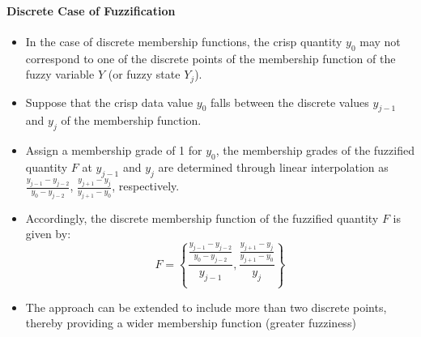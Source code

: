 \documentclass{tron}
\begin{document}
\paragraph{Discrete Case of Fuzzification}
\begin{itemize}
	\item In the case of discrete membership functions, the crisp quantity $y_0$ may not correspond to one of the discrete points of the membership function of the fuzzy variable $Y$ (or fuzzy state $Y_j$).
	\item Suppose that the crisp data value $y_0$ falls between the discrete values $y_{j-1}$ and $y_j$ of the membership function.
	\item Assign a membership grade of 1 for $y_0$, the membership grades of the fuzzified quantity $F$ at $y_{j-1}$ and $y_j$ are determined through linear interpolation as $\frac{y_{j-1} - y_{j-2}}{y_0 - y_{j-2}}$, $\frac{y_{j+1}-y_j}{y_{j+1}-y_0}$, respectively.
	\item Accordingly, the discrete membership function of the fuzzified quantity $F$ is given by:
	\begin{equation}
		F = \left\{ \frac{\frac{y_{j-1} - y_{j-2}}{y_0 - y_{j-2}}}{y_{j-1}} , \frac{\frac{y_{j+1}-y_j}{y_{j+1}-y_0}}{y_j}\right\}
	\end{equation}
	\item The approach can be extended to include more than two discrete points, thereby providing a wider membership function (greater fuzziness)
\end{itemize}

\end{document}
